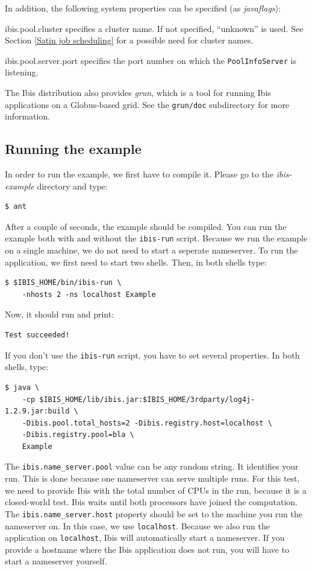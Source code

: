\documentclass[10pt]{article}
\newcommand{\mysubsection}[1]{\subsection{#1}\label{#1}}
\begin{document}
In addition, the following system properties can be specified
(as \emph{javaflags}):
\begin{description}
\item{ibis.pool.cluster}
specifies a cluster name. If not specified,
``unknown'' is used.
See Section \ref{Satin job scheduling} for a possible need for cluster
names.
\item{ibis.pool.server.port}
specifies the port number on which the
\texttt{PoolInfoServer} is listening.
\end{description}

The Ibis distribution also provides \emph{grun}, which is a tool for
running Ibis applications on a Globus-based grid. See the
\texttt{grun/doc} subdirectory for more information.

\mysubsection{Running the example}
In order to run the example, we first have to compile it.
Please go to the \emph{ibis-example} directory and type:

\noindent
{\small
\begin{verbatim}
$ ant
\end{verbatim}
}
\noindent
After a couple of seconds, the example should be compiled.
You can run the example both with and without the \texttt{ibis-run} script.
Because we run the example on a single machine, we do not need to start a seperate nameserver.
To run the application, we first need to start two shells.
Then, in both shells type:

\noindent
{\small
\begin{verbatim}
$ $IBIS_HOME/bin/ibis-run \
    -nhosts 2 -ns localhost Example
\end{verbatim}
}
\noindent
Now, it should run and print:

\noindent
{\small
\begin{verbatim}
Test succeeded!
\end{verbatim}
}
\noindent
If you don't use the \texttt{ibis-run} script, you have to set several properties.
In both shells, type:

\noindent
{\small
\begin{verbatim}
$ java \
    -cp $IBIS_HOME/lib/ibis.jar:$IBIS_HOME/3rdparty/log4j-1.2.9.jar:build \
    -Dibis.pool.total_hosts=2 -Dibis.registry.host=localhost \
    -Dibis.registry.pool=bla \
    Example
\end{verbatim}
}
\noindent
The \texttt{ibis.name\_server.pool} value can be any random string.
It identifies your run.
This is done because one nameserver can serve multiple
runs. For this test, we need to provide Ibis with the total number of
CPUs in the run, because it is a closed-world test. Ibis waits until
both processors have joined the computation.
The \texttt{ibis.name\_server.host} property should
be set to the machine you run the nameserver on.  In this case, we use
\texttt{localhost}.
Because we also run the application on \texttt{localhost}, Ibis will
automatically start a nameserver. If you provide a hostname where the
Ibis application does not run, you will have to start a nameserver
yourself.
\end{document}
